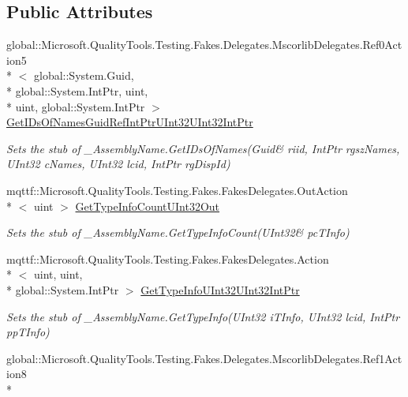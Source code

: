 \subsection*{Public Attributes}
\begin{DoxyCompactItemize}
\item 
global\-::\-Microsoft.\-Quality\-Tools.\-Testing.\-Fakes.\-Delegates.\-Mscorlib\-Delegates.\-Ref0\-Action5\\*
$<$ global\-::\-System.\-Guid, \\*
global\-::\-System.\-Int\-Ptr, uint, \\*
uint, global\-::\-System.\-Int\-Ptr $>$ \hyperlink{class_system_1_1_runtime_1_1_interop_services_1_1_fakes_1_1_stub___assembly_name_af62ce86f08a0f9b45c0ef11dc9ed41b7}{Get\-I\-Ds\-Of\-Names\-Guid\-Ref\-Int\-Ptr\-U\-Int32\-U\-Int32\-Int\-Ptr}
\begin{DoxyCompactList}\small\item\em Sets the stub of \-\_\-\-Assembly\-Name.\-Get\-I\-Ds\-Of\-Names(Guid\& riid, Int\-Ptr rgsz\-Names, U\-Int32 c\-Names, U\-Int32 lcid, Int\-Ptr rg\-Disp\-Id)\end{DoxyCompactList}\item 
mqttf\-::\-Microsoft.\-Quality\-Tools.\-Testing.\-Fakes.\-Fakes\-Delegates.\-Out\-Action\\*
$<$ uint $>$ \hyperlink{class_system_1_1_runtime_1_1_interop_services_1_1_fakes_1_1_stub___assembly_name_aa559163d2f48eca2d481b28521525026}{Get\-Type\-Info\-Count\-U\-Int32\-Out}
\begin{DoxyCompactList}\small\item\em Sets the stub of \-\_\-\-Assembly\-Name.\-Get\-Type\-Info\-Count(U\-Int32\& pc\-T\-Info)\end{DoxyCompactList}\item 
mqttf\-::\-Microsoft.\-Quality\-Tools.\-Testing.\-Fakes.\-Fakes\-Delegates.\-Action\\*
$<$ uint, uint, \\*
global\-::\-System.\-Int\-Ptr $>$ \hyperlink{class_system_1_1_runtime_1_1_interop_services_1_1_fakes_1_1_stub___assembly_name_a6b60b1dc0ccd15361e6d0adaffd137a7}{Get\-Type\-Info\-U\-Int32\-U\-Int32\-Int\-Ptr}
\begin{DoxyCompactList}\small\item\em Sets the stub of \-\_\-\-Assembly\-Name.\-Get\-Type\-Info(\-U\-Int32 i\-T\-Info, U\-Int32 lcid, Int\-Ptr pp\-T\-Info)\end{DoxyCompactList}\item 
global\-::\-Microsoft.\-Quality\-Tools.\-Testing.\-Fakes.\-Delegates.\-Mscorlib\-Delegates.\-Ref1\-Action8\\*

\end{DoxyCompactItemize}
